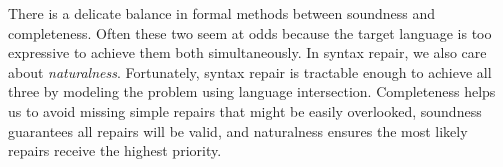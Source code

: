 \documentclass[sigplan,review,acmsmall,nonacm,screen,anonymous]{acmart}\settopmatter{printfolios=false,printccs=false,printacmref=false}
\begin{document}
There is a delicate balance in formal methods between soundness and completeness. Often these two seem at odds because the target language is too expressive to achieve them both simultaneously. In syntax repair, we also care about \textit{naturalness}. Fortunately, syntax repair is tractable enough to achieve all three by modeling the problem using language intersection. Completeness helps us to avoid missing simple repairs that might be easily overlooked, soundness guarantees all repairs will be valid, and naturalness ensures the most likely repairs receive the highest priority.




\end{document}
